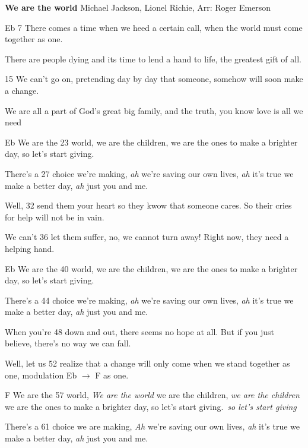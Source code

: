 \documentclass[10pt]{article}
\begin{document}
\twocolumn

\begin{guitar}
    \textbf{We are the world} Michael Jackson, Lionel Richie,
    Arr: Roger Emerson

    {\tiny Eb 7} There comes a time
    when we heed a certain call,
    when the world
    must come together as one.

    There are people dying
    and its time to lend a hand
    to life,
    the greatest gift of all.

    {\tiny 15} We can't go on,
    pretending day by day
    that someone, somehow
    will soon make a change.

    We are all a part of
    God's great big family,
    and the truth, you know
    love is all we need

    {\tiny Eb} We are the {\tiny 23} world,
    we are the children,
    we are the ones to make a brighter day,
    so let's start giving.

    There's a {\tiny 27} choice we're making, \emph{ah}
    we're saving our own lives, \emph{ah}
    it's true we make a better day, \emph{ah}
    just you and me.

    Well, {\tiny 32} send them your heart
    so they kwow that someone cares.
    So their cries for help
    will not be in vain.

    We can't {\tiny 36} let them suffer,
    no, we cannot turn away!
    Right now,
    they need a helping hand.

    {\tiny Eb} We are the {\tiny 40} world,
    we are the children,
    we are the ones to make a brighter day,
    so let's start giving.

    There's a {\tiny 44} choice we're making, \emph{ah}
    we're saving our own lives, \emph{ah}
    it's true we make a better day, \emph{ah}
    just you and me.

    When you're {\tiny 48} down and out,
    there seems no hope at all.
    But if you just believe,
    there's no way we can fall.

    Well, let us {\tiny 52} realize
    that a change will only come
    when we stand together as one,
    {\tiny modulation Eb $\to$ F} as one.

    {\tiny F} We are the {\tiny 57} world, \emph{We are the world}
    we are the children, \emph{we are the children}
    we are the ones to make a brighter day,
    so let's start giving. \emph{so let's start giving}

    There's a {\tiny 61} choice we are making, \emph{Ah}
    we're saving our own lives, \emph{ah}
    it's true we make a better day, \emph{ah}
    just you and me.


\end{guitar}
\end{document}
